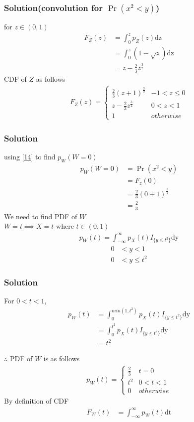\documentclass{beamer}
\begin{document}
\begin{frame}
\frametitle{Solution(convolution for $\Pr(x^2<y)$)}
for $z \in (0,1)$
\begin{align}
F_Z(z)&=\int_{0}^{z} p_{Z}(z) \mathrm{dz}\\
      &=\int_{0}^{z} (1-\sqrt{z}) \mathrm{dz}\\
      &= z-\frac{2}{3}{z}^\frac{3}{2}
\end{align}
CDF of $Z$ as follows
\begin{align}
F_{Z}(z)  = 
\begin{cases}
      \frac{2}{3}{(z+1)}^\frac{3}{2} & -1 < z \leq 0 \\
      z-\frac{2}{3}{z}^\frac{3}{2} & 0 < z < 1 \\
      1 & otherwise
\end{cases} \label{14}
\end{align}

\end{frame}
\begin{frame}
\frametitle{Solution}
 using \eqref{14} to find $p_W(W=0)$
\begin{align}
p_W(W=0) &=\Pr(x^2 <y) \\
         &=F_z(0) \\
         &=\frac{2}{3}(0+1)^\frac{3}{2} \\
         &=\frac{2}{3} \label{15}
\end{align}
We need to find PDF of $W$\\
$W=t \implies X=t $ where $t \in (0,1)$
\begin{align}
p_{W}(t) = \int_{- \infty}^{\infty} p_X(t)I_{\{y\leq t^2\}} \mathrm{dy}
\end{align}
\begin{align}
   0 &< y < 1 \label{16} \\
   0 &< y \leq t^2  \label{17}
\end{align}
\end{frame}
\begin{frame}
\frametitle{Solution}
For $ 0 < t < 1 $,
\begin{align}
p_W(t) &= \int_{0}^{min(1,t^2)} p_X(t)I_{\{y \leq t^2\}} \mathrm{dy} \\
       &=\int_{0}^{t^2} p_X(t)I_{\{y \leq t^2\}} \mathrm{dy} \\
       &= t^2 \label{18}
\end{align}

$\therefore$ PDF of $W$ is as follows
\begin{align}
p_{W}(t)  = 
\begin{cases}
  \frac{2}{3}& t=0 \\
  t^2 & 0 < t < 1 \\
  0 & otherwise
\end{cases} \label{19}
\end{align}
By definition of CDF
\begin{align}
F_W(t)&=\int_{-\infty}^{\infty} p_{W}(t) \mathrm{dt}\\
\end{align}

\end{frame}
\end{document}
